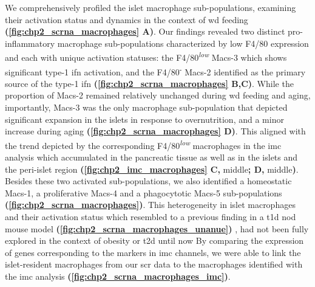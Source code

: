 \par We comprehensively profiled the islet macrophage sub-populations, examining their activation status and dynamics in the context of \gls{wd} feeding \textbf{(\autoref{fig:chp2_scrna_macrophages} A)}. Our findings revealed two distinct pro-inflammatory macrophage sub-populations characterized by low F4/80 expression and each with unique activation statuses: the F4/80\textsuperscript{\textit{low}} Macs-3 which shows significant type-1  \gls{ifn} activation, and the F4/80\textsuperscript{-} Macs-2 identified as the primary source of the type-1 \gls{ifn} \textbf{(\autoref{fig:chp2_scrna_macrophages} B,C)}. While the proportion of Macs-2 remained relatively unchanged during \gls{wd} feeding and aging, importantly, Macs-3 was the only macrophage sub-population that depicted significant expansion in the islets in response to overnutrition, and a minor increase during aging \textbf{(\autoref{fig:chp2_scrna_macrophages} D)}. This aligned with the trend depicted by the corresponding F4/80\textsuperscript{\textit{low}} macrophages in the \gls{imc} analysis which accumulated in the pancreatic tissue as well as in the islets and the peri-islet region \textbf{(\autoref{fig:chp2_imc_macrophages} C,} middle\textbf{; D,} middle\textbf{)}. Besides these two activated sub-populations, we also identified a homeostatic Macs-1, a proliferative Macs-4 and a phagocytotic Macs-5 sub-populations \textbf{(\autoref{fig:chp2_scrna_macrophages})}. This heterogeneity in islet macrophages and their activation status which resembled to a previous finding in a \gls{t1d} \gls{nod} mouse model \textbf{(\autoref{fig:chp2_scrna_macrophages_unanue})} \textbf{\cite{zakharov_single-cell_2020}}, had not been fully explored in the context of obesity or \gls{t2d} until now By comparing the expression of genes corresponding to the markers in \gls{imc} channels, we were able to link the islet-resident macrophages from our \gls{scr} data to the macrophages identified with the \gls{imc} analysis \textbf{(\autoref{fig:chp2_scrna_macrophages_imc})}.\\   %


